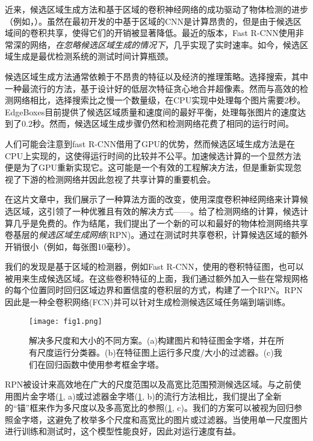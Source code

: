 \documentclass[../main]{subfile}
\begin{document}
近来，候选区域生成方法和基于区域的卷积神经网络的成功驱动了物体检测的进步（例如，\cite{selectiveSearch}）。虽然在最初开发的\cite{rcnn}中基于区域的CNN是计算昂贵的，但是由于候选区域间的卷积共享，使得它们的开销被显著降低。最近的版本，Fast R-CNN\cite{fastrcnn}使用非常深的网络，\textit{在忽略候选区域生成的情况下}，几乎实现了实时速率。如今，候选区域生成是最优检测系统的测试时间计算瓶颈。

候选区域生成方法通常依赖于不昂贵的特征以及经济的推理策略。选择搜索\cite{selectiveSearch}，其中一种最流行的方法，基于设计好的低层次特征贪心地合并超像素。然而与高效的检测网络\cite{fastrcnn}相比，选择搜索比之慢一个数量级，在CPU实现中处理每个图片需要2秒。EdgeBoxes\cite{edgeBoxes}目前提供了候选区域质量和速度间的最好平衡，处理每张图片的速度达到了0.2秒。然而，候选区域生成步骤仍然和检测网络花费了相同的运行时间。

人们可能会注意到fast R-CNN借用了GPU的优势，然而候选区域生成方法是在CPU上实现的，这使得运行时间的比较并不公平。加速候选计算的一个显然方法便是为了GPU重新实现它。这可能是一个有效的工程解决方法，但是重新实现忽视了下游的检测网络并因此忽视了共享计算的重要机会。

在这片文章中，我们展示了一种算法方面的改变，使用深度卷积神经网络来计算候选区域，这引领了一种优雅且有效的解决方式——。给了检测网络的计算，候选计算几乎是免费的。作为结尾，我们提出了一个新的可以和最好的物体检测网络\cite{fastrcnn, rcnn}共享卷基层的\textit{候选区域生成网络}(RPN)。通过在测试时共享卷积，计算候选区域的额外开销很小（例如，每张图10毫秒）。

我们的发现是基于区域的检测器，例如Fast R-CNN，使用的卷积特征图，也可以被用来生成候选区域。在这些卷积特征的上面，我们通过额外加入一些在常规网格的每个位置同时回归区域边界和置信度的卷积层的方式，构建了一个RPN。RPN因此是一种全卷积网络(FCN)\cite{fcn}并可以针对生成检测候选区域任务端到端训练。

\begin{figure}[bh]
    \centering
    \texttt{[image: fig1.png]}
    \label{fig:img1}
    \caption{解决多尺度和大小的不同方案。(a)构建图片和特征图金字塔，并在所有尺度运行分类器。(b)在特征图上运行多尺度/大小的过滤器。(c)我们在回归函数中使用参考框金字塔。}
\end{figure}

RPN被设计来高效地在广大的尺度范围以及高宽比范围预测候选区域。与之前使用图片金字塔(\ref{fig:img1}, a)或过滤器金字塔(\ref{fig:img1}, b)的流行方法\cite{overfeat, dpm, rcnn, fastrcnn, }相比，我们提出了全新的“锚”框来作为多尺度以及多高宽比的参照(\ref{fig:img1}, c)。我们的方案可以被视为回归参照金字塔，这避免了枚举多个尺度和高宽比的图片或过滤器。当使用单一尺度图片进行训练和测试时，这个模型性能良好，因此对运行速度有益。
\end{document}
